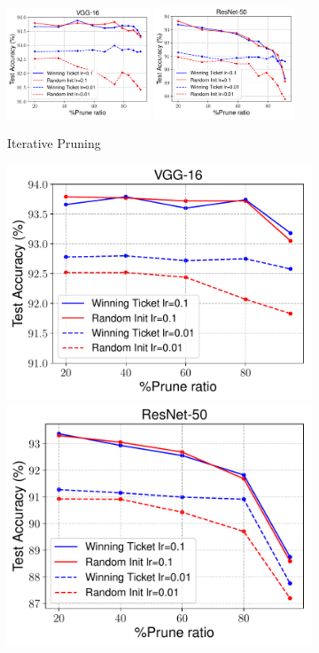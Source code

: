 \begin{figure}[!ht]
\centering
\begin{minipage}{0.96\textwidth}
 \begin{subfigure}{\textwidth}
 \centering
 \includegraphics[width=0.47\textwidth]{figures/vgg.pdf}
 \includegraphics[width=0.46\textwidth]{figures/resnet.pdf}
 \vspace{-2ex}
 \caption{Iterative Pruning}
 \label{iterative-1}
 \end{subfigure}
\end{minipage}
 \begin{minipage}{0.96\textwidth}
 \begin{subfigure}{\textwidth}
 \centering
 \includegraphics[width=.47\textwidth]{figures/vgg-one-shot.pdf}
 \includegraphics[width=.46\textwidth]{figures/resnet-one-shot.pdf}

\end{subfigure}
\end{minipage}
\end{figure}
